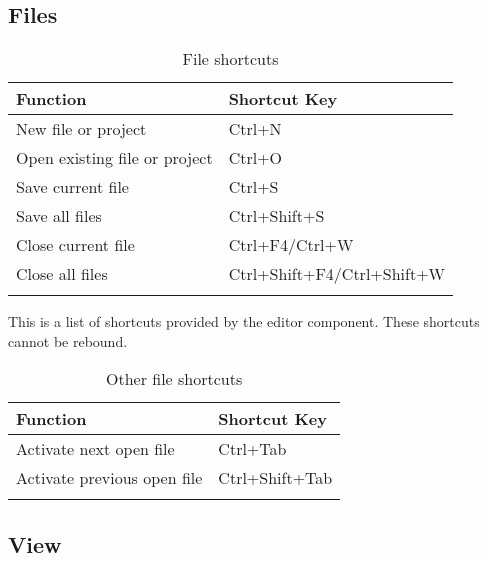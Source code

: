 \subsection{Files}

{\small 
\begin{longtable}{|l|l|}\hline
\textbf{Function}		        &   \textbf{Shortcut Key}       \\ \hline
\endhead   %
New file or project 	        &	Ctrl+N                      \\ \hline
Open existing file or project   &	Ctrl+O                      \\ \hline
Save current file 	            &	Ctrl+S                      \\ \hline
Save all files 		            &	Ctrl+Shift+S                \\ \hline
Close current file 	            &	Ctrl+F4/Ctrl+W              \\ \hline
Close all files 	            &	Ctrl+Shift+F4/Ctrl+Shift+W  \\ \hline
\caption{File shortcuts}
\end{longtable}
}

This is a list of shortcuts provided by the \codeblocks editor component. These shortcuts cannot be rebound.

{\small 
\begin{longtable}{|l|l|}\hline
\textbf{Function}		    &   \textbf{Shortcut Key}   \\ \hline
\endhead   %
Activate next open file 	&   Ctrl+Tab                \\ \hline
Activate previous open file &   Ctrl+Shift+Tab          \\ \hline
\caption{Other file shortcuts}
\end{longtable}
}

\subsection{View}

